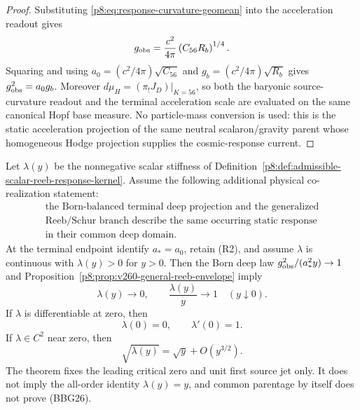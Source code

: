 \documentclass[12pt,a4paper]{article}
\begin{document}
\begin{proof}
Substituting \eqref{p8:eq:response-curvature-geomean} into the acceleration readout gives
\[
g_{\rm obs}
=
\frac{c^2}{4\pi}\left(C_{56}R_b\right)^{1/4}.
\]
Squaring and using
\(a_0=(c^2/4\pi)\sqrt{C_{56}}\) and
\(g_b=(c^2/4\pi)\sqrt{R_b}\) gives
\(g_{\rm obs}^2=a_0g_b\).  Moreover
\(d\mu_H=(\pi_!J_D)|_{K=56}\), so both the baryonic source-curvature readout
and the terminal acceleration scale are evaluated on the same canonical Hopf
base measure.  No particle-mass conversion is used: this is the static
acceleration projection of the same neutral scalaron/gravity parent whose
homogeneous Hodge projection supplies the cosmic-response current.
\end{proof}

\begin{theorem}
\label{p8:thm:v260-born-g26-first-jet}
Let \(\lambda(y)\) be the nonnegative scalar stiffness of
Definition~\ref{p8:def:admissible-scalar-reeb-response-kernel}.  Assume the
following additional physical co-realization statement:
\begin{equation}
 \label{p8:eq:v260-BBG26}
 \tag{BBG26}
 \begin{gathered}
 \text{the Born-balanced terminal deep projection and the generalized}\\
 \text{Reeb/Schur branch describe the same occurring static response}\\
 \text{in their common deep domain.}
 \end{gathered}
\end{equation}
At the terminal endpoint identify \(a_*=a_0\), retain (R2), and assume
\(\lambda\) is continuous with \(\lambda(y)>0\) for \(y>0\).  Then the Born
deep law
\(g_{\rm obs}^2/(a_*^2y)\to1\) and
Proposition~\ref{p8:prop:v260-general-reeb-envelope} imply
\begin{equation}
 \label{p8:eq:v260-lambda-first-jet-limit}
 \boxed{\lambda(y)\longrightarrow0,\qquad
 \frac{\lambda(y)}{y}\longrightarrow1
 \quad(y\downarrow0).}
\end{equation}
If \(\lambda\) is differentiable at zero, then
\begin{equation}
 \label{p8:eq:v260-lambda-first-jet}
 \boxed{\lambda(0)=0,\qquad \lambda'(0)=1.}
\end{equation}
If \(\lambda\in C^2\) near zero, then
\begin{equation}
 \label{p8:eq:v260-leading-critical-root}
 \boxed{\sqrt{\lambda(y)}=\sqrt y+O(y^{3/2}).}
\end{equation}
The theorem fixes the leading critical zero and unit first source jet only.
It does not imply the all-order identity \(\lambda(y)=y\), and common
parentage by itself does not prove (BBG26).
\end{theorem}
\end{document}
